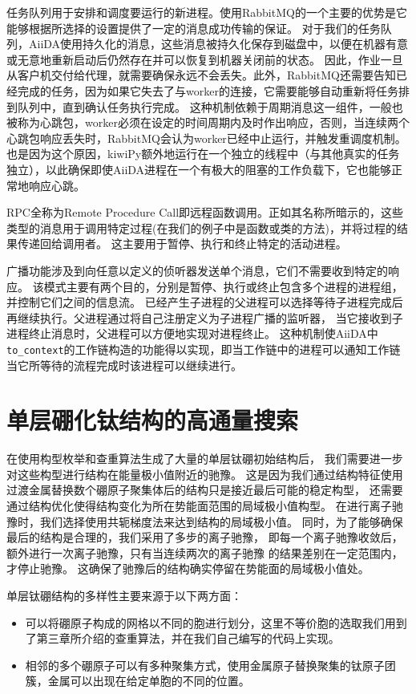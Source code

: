 任务队列用于安排和调度要运行的新进程。使用RabbitMQ的一个主要的优势是它能够根据所选择的设置提供了一定的消息成功传输的保证。
对于我们的任务队列，AiiDA使用持久化的消息，这些消息被持久化保存到磁盘中，以便在机器有意或无意地重新启动后仍然存在并可以恢复到机器关闭前的状态。
因此，作业一旦从客户机交付给代理，就需要确保永远不会丢失。此外，RabbitMQ还需要告知已经完成的任务，因为如果它失去了与worker的连接，它需要能够自动重新将任务排到队列中，直到确认任务执行完成。
这种机制依赖于周期消息这一组件，一般也被称为心跳包，worker必须在设定的时间周期内及时作出响应，否则，当连续两个心跳包响应丢失时，RabbitMQ会认为worker已经中止运行，并触发重调度机制。
也是因为这个原因，kiwiPy额外地运行在一个独立的线程中（与其他真实的任务独立），以此确保即使AiiDA进程在一个有极大的阻塞的工作负载下，它也能够正常地响应心跳。

RPC全称为Remote Procedure Call即远程函数调用。正如其名称所暗示的，这些类型的消息用于调用特定过程(在我们的例子中是函数或类的方法)，并将过程的结果传递回给调用者。
这主要用于暂停、执行和终止特定的活动进程。

广播功能涉及到向任意以定义的侦听器发送单个消息，它们不需要收到特定的响应。
该模式主要有两个目的，分别是暂停、执行或终止包含多个进程的进程组，并控制它们之间的信息流。
已经产生子进程的父进程可以选择等待子进程完成后再继续执行。父进程通过将自己注册定义为子进程广播的监听器，
当它接收到子进程终止消息时，父进程可以方便地实现对进程终止。
这种机制使AiiDA中\texttt{to\_context}的工作链构造的功能得以实现，即当工作链中的进程可以通知工作链当它所等待的流程完成时该进程可以继续进行。

\section{单层硼化钛结构的高通量搜索}

在使用构型枚举和查重算法生成了大量的单层钛硼初始结构后，
我们需要进一步对这些构型进行结构在能量极小值附近的驰豫。
这是因为我们通过结构特征使用过渡金属替换数个硼原子聚集体后的结构只是接近最后可能的稳定构型，
还需要通过结构优化使得结构变化为所在势能面范围的局域极小值构型。
在进行离子驰豫时，我们选择使用共轭梯度法来达到结构的局域极小值。
同时，为了能够确保最后的结构是合理的，我们采用了多步的离子驰豫，
即每一个离子驰豫收敛后，额外进行一次离子驰豫，只有当连续两次的离子驰豫
的结果差别在一定范围内，才停止驰豫。
这确保了驰豫后的结构确实停留在势能面的局域极小值处。

单层钛硼结构的多样性主要来源于以下两方面：
\begin{itemize}
  \item 可以将硼原子构成的网格以不同的胞进行划分，这里不等价胞的选取我们用到了第三章所介绍的查重算法，并在我们自己编写的代码上实现。
  \item 相邻的多个硼原子可以有多种聚集方式，使用金属原子替换聚集的钛原子团簇，金属可以出现在给定单胞的不同的位置。
\end{itemize}

